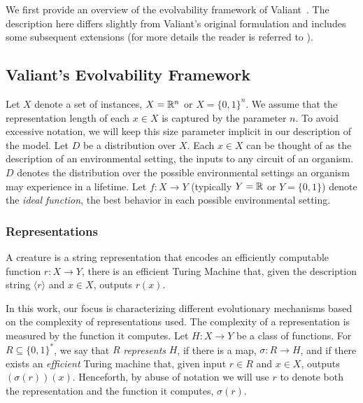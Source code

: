 We first provide an overview of the evolvability framework of
Valiant~\cite{Valiant:2009-evolvability}. The description here differs slightly
from Valiant's original formulation and includes some subsequent extensions (for
more details the reader is referred to
\cite{Valiant:2009-evolvability,Feldman:2008-evolvability,
Feldman:2009-robustness, Valiant:2012-real, Kanade:2012-thesis}).

\subsection{Valiant's Evolvability Framework}
\label{sec:notation-model}

Let $X$ denote a set of instances, \eg $X = \mathbb{R}^n$ or $X = \{0, 1\}^n$. We
assume that the representation length of each $x \in X$ is captured by the
parameter $n$. To avoid excessive notation, we will keep this size parameter
implicit in our description of the model. Let $D$ be a distribution over $X$.
Each $x \in X$ can be thought of as the description of an environmental setting,
the inputs to any circuit of an organism. $D$ denotes the distribution over the
possible environmental settings an organism may experience in a lifetime. Let $f
: X \rightarrow Y$ (typically $Y = \mathbb{R}$ or $Y = \{0, 1\}$) denote the
\emph{ideal function}, the best behavior in each possible environmental
setting.

\subsubsection*{Representations}

A creature is a string representation that encodes an efficiently computable
function $r : X \rightarrow Y$, \ie there is an efficient Turing Machine that,
given the description string $\langle r \rangle$ and $x \in X$, outputs $r(x)$.  

In this work, our focus is characterizing different evolutionary mechanisms
based on the complexity of representations used. 
The complexity of a representation is measured by the function it computes.  Let
$H : X \rightarrow Y$ be a class of functions. For $R \subseteq \{0, 1\}^*$,  we
say that $R$ \emph{represents} $H$, if there is a map, $\sigma : R \rightarrow
H$, and if there exists an \emph{efficient} Turing machine that, given input $r
\in R$ and $x \in X$, outputs $(\sigma(r))(x)$. Henceforth, by abuse of notation
we will use $r$ to denote both the representation and the function it computes,
$\sigma(r)$. 

